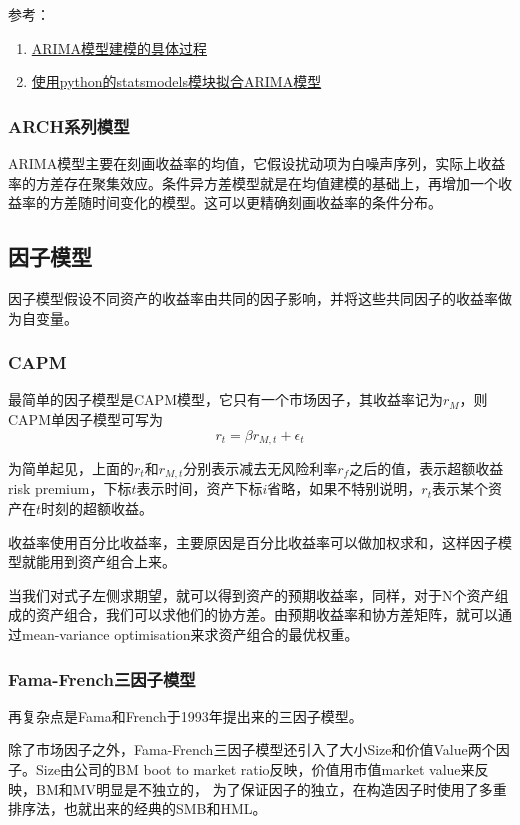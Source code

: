\documentclass[11pt,oneside,a4paper,notitlepage]{article}
\begin{document}
\begin{CJK}{UTF8}{gbsn}
  参考：
  \begin{enumerate}
 \item  \href{https://yuchen112358.github.io/2016/10/09/ARIMA/}{ARIMA模型建模的具体过程}
 \item  \href{https://blog.csdn.net/weixin\_45590329/article/details/112818196}{使用python的statsmodels模块拟合ARIMA模型}
  \end{enumerate}
\subsubsection{ARCH系列模型}
ARIMA模型主要在刻画收益率的均值，它假设扰动项为白噪声序列，实际上收益率的方差存在聚集效应。条件异方差模型就是在均值建模的基础上，再增加一个收益率的方差随时间变化的模型。这可以更精确刻画收益率的条件分布。

\subsection{因子模型}
因子模型假设不同资产的收益率由共同的因子影响，并将这些共同因子的收益率做为自变量。 
\subsubsection{CAPM}
最简单的因子模型是CAPM模型，它只有一个市场因子，其收益率记为$r_M$，则CAPM单因子模型可写为
$$r_t = \beta r_{M,t} + \epsilon_t $$

为简单起见，上面的$r_t$和$r_{M,t}$分别表示减去无风险利率$r_f$之后的值，表示超额收益 risk premium，下标$t$表示时间，资产下标$i$省略，如果不特别说明，$r_t$表示某个资产在$t$时刻的超额收益。

收益率使用百分比收益率，主要原因是百分比收益率可以做加权求和，这样因子模型就能用到资产组合上来。

当我们对式子左侧求期望，就可以得到资产的预期收益率，同样，对于N个资产组成的资产组合，我们可以求他们的协方差。由预期收益率和协方差矩阵，就可以通过mean-variance optimisation来求资产组合的最优权重。


\subsubsection{Fama-French三因子模型}
再复杂点是Fama和French于1993年提出来的三因子模型。

除了市场因子之外，Fama-French三因子模型还引入了大小Size和价值Value两个因子。Size由公司的BM boot to market ratio反映，价值用市值market value来反映，BM和MV明显是不独立的， 为了保证因子的独立，在构造因子时使用了多重排序法，也就出来的经典的SMB和HML。


\end{CJK}
\end{document}
